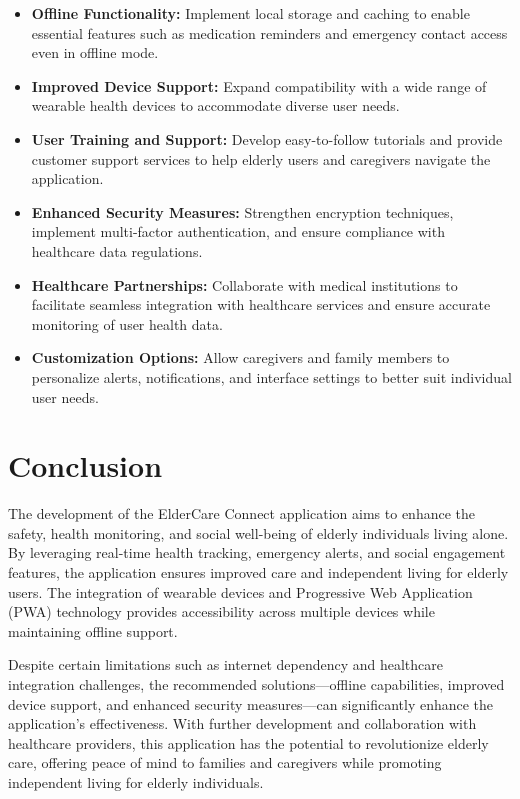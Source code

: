 \begin{itemize}
    \item \textbf{Offline Functionality:} Implement local storage and caching to enable essential features such as medication reminders and emergency contact access even in offline mode.
    \item \textbf{Improved Device Support:} Expand compatibility with a wide range of wearable health devices to accommodate diverse user needs.
    \item \textbf{User Training and Support:} Develop easy-to-follow tutorials and provide customer support services to help elderly users and caregivers navigate the application.
    \item \textbf{Enhanced Security Measures:} Strengthen encryption techniques, implement multi-factor authentication, and ensure compliance with healthcare data regulations.
    \item \textbf{Healthcare Partnerships:} Collaborate with medical institutions to facilitate seamless integration with healthcare services and ensure accurate monitoring of user health data.
    \item \textbf{Customization Options:} Allow caregivers and family members to personalize alerts, notifications, and interface settings to better suit individual user needs.
\end{itemize}

\section{Conclusion}
The development of the ElderCare Connect application aims to enhance the safety, health monitoring, and social well-being of elderly individuals living alone. By leveraging real-time health tracking, emergency alerts, and social engagement features, the application ensures improved care and independent living for elderly users. The integration of wearable devices and Progressive Web Application (PWA) technology provides accessibility across multiple devices while maintaining offline support.

Despite certain limitations such as internet dependency and healthcare integration challenges, the recommended solutions—offline capabilities, improved device support, and enhanced security measures—can significantly enhance the application's effectiveness. With further development and collaboration with healthcare providers, this application has the potential to revolutionize elderly care, offering peace of mind to families and caregivers while promoting independent living for elderly individuals.



